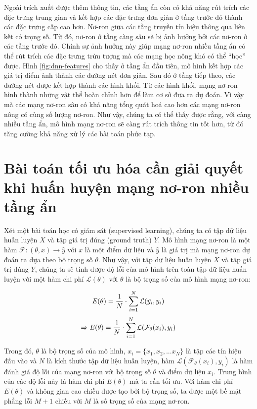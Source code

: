 Ngoài trích xuất được thêm thông tin, các tầng ẩn còn có khả năng rút trích các đặc trưng trung gian và kết hợp các đặc trưng đơn giản ở tầng trước đó thành các đặc trưng cấp cao hơn. Nơ-ron giữa các tầng truyền tín hiệu thông qua liên kết có trọng số. Từ đó, nơ-ron ở tầng càng sâu sẽ bị ảnh hưởng bởi các nơ-ron ở các tầng trước đó. Chính sự ảnh hưởng này giúp mạng nơ-ron nhiều tầng ẩn có thể rút trích các đặc trưng trừu tượng mà các mạng học nông khó có thể ``học'' được. Hình \ref{fig:dnn-features} cho thấy ở tầng ẩn đầu tiên, mô hình kết hợp các giá trị điểm ảnh thành các đường nét đơn giản. Sau đó ở tầng tiếp theo, các đường nét được kết hợp thành các hình khối. Từ các hình khối, mạng nơ-ron hình thành những vật thể hoàn chỉnh hơn để làm cơ sở đưa ra dự đoán. Vì vậy mà các mạng nơ-ron sâu có khả năng tổng quát hoá cao hơn các mạng nơ-ron nông có cùng số lượng nơ-ron. Như vậy, chúng ta có thể thấy được rằng, với càng nhiều tầng ẩn, mô hình mạng nơ-ron sẽ càng rút trích thông tin tốt hơn, từ đó tăng cường khả năng xử lý các bài toán phức tạp.

\section{Bài toán tối ưu hóa cần giải quyết khi huấn huyện mạng nơ-ron nhiều tầng ẩn}

Xét một bài toán học có giám sát (supervised learning), chúng ta có tập dữ liệu huấn luyện $X$ và tập giá trị đúng (ground truth) $Y$. Mô hình mạng nơ-ron là một hàm $\mathcal{F}: (\theta, x) \rightarrow \hat{y}$ với $x$ là một điểm dữ liệu và $\hat{y}$ là giá trị mà mạng nơ-ron dự đoán ra dựa theo bộ trọng số $\theta$. Như vậy, với tập dữ liệu huấn luyện $X$ và tập giá trị đúng $Y$, chúng ta sẽ tính được độ lỗi của mô hình trên toàn tập dữ liệu huấn luyện với một hàm chi phí $\mathcal{L}(\theta)$ với $\theta$ là bộ trọng số của mô hình mạng nơ-ron:

\begin{equation}
	\label{eqn:E-y}
	\mathbf{\it{E}(\theta)} = \frac{1}{N}\cdot \sum_{i=1}^{N}\mathcal{L}(\hat{y_i}, y_i)
\end{equation}
\begin{equation}
	\label{eqn:E-Fx}
	\Rightarrow \mathbf{\it{E}(\theta)} = \frac{1}{N}\cdot \sum_{i=1}^{N}\mathcal{L}(\mathcal{F}_\theta( x_i), y_i)
\end{equation}

Trong đó, $\theta$ là bộ trọng số của mô hình, $x_i = \{x_1, x_2,...x_N\}$ là tập các tín hiệu đầu vào và $N$ là kích thước tập dữ liệu huấn luyện, hàm $\mathcal{L}(\mathcal{F}_\theta( x_i), y_i)$ là hàm đánh giá độ lỗi của mạng nơ-ron với bộ trọng số $\theta$ và điểm dữ liệu $x_i$. Trung bình của các độ lỗi này là hàm chi phí $E(\theta)$ mà ta cần tối ưu. Với hàm chi phí $E(\theta)$ và không gian cao chiều được tạo bởi bộ trọng số, ta được một bề mặt phẳng lỗi $M+1$ chiều với $M$ là số trọng số của mạng nơ-ron.

